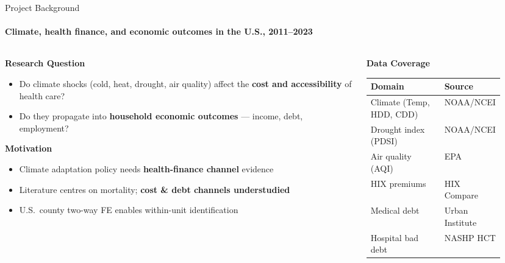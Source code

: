 \documentclass[aspectratio=169,11pt]{beamer}
\newcommand{\emphcolor}[1]{{\color{WarmOrange}\textbf{#1}}}
\newcommand{\tealtext}[1]{{\color{Teal}#1}}
\begin{document}
\begin{frame}{Project Background}
  \framesubtitle{Climate, health finance, and economic outcomes in the U.S., 2011--2023}
  \begin{columns}[T]
    \begin{column}{0.47\textwidth}
      \footnotesize
      \textbf{\tealtext{Research Question}}
      \begin{itemize}\itemsep0.15em
        \item Do climate shocks (cold, heat, drought, air quality) affect the \emphcolor{cost and accessibility} of health care?
        \item Do they propagate into \emphcolor{household economic outcomes} — income, debt, employment?
      \end{itemize}
      \vspace{0.15em}
      \textbf{\tealtext{Motivation}}
      \begin{itemize}\itemsep0.15em
        \item Climate adaptation policy needs \emphcolor{health-finance channel} evidence
        \item Literature centres on mortality; \emphcolor{cost \& debt channels understudied}
        \item U.S.\ county two-way FE enables within-unit identification
      \end{itemize}
    \end{column}
    \begin{column}{0.47\textwidth}
      \textbf{\tealtext{Data Coverage}}\\[0.3em]
      \scriptsize
      \begin{tabular}{@{}>{\raggedright\arraybackslash}p{0.56\linewidth}>{\raggedright\arraybackslash}p{0.26\linewidth}@{}}
        \toprule
        Domain & Source \\
        \midrule
        Climate (Temp, HDD, CDD) & NOAA/NCEI \\
        Drought index (PDSI)     & NOAA/NCEI \\
        Air quality (AQI)        & EPA \\
        HIX premiums             & HIX Compare \\
        Medical debt             & Urban Institute \\
        Hospital bad debt        & NASHP HCT \\

\end{tabular}
\end{column}
\end{columns}
\end{frame}
\end{document}
